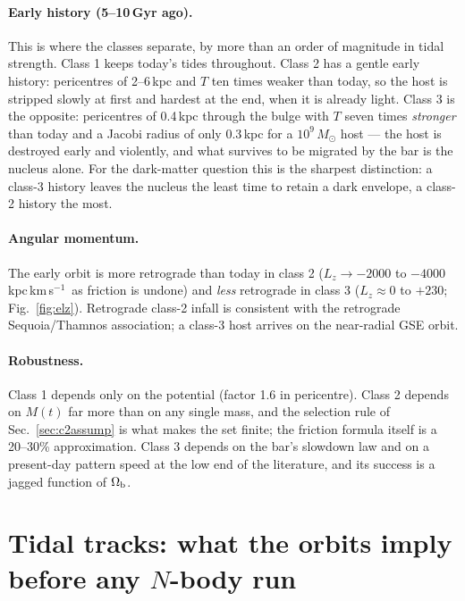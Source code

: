 \documentclass[11pt,a4paper]{article}
\newcommand{\kms}{km\,s$^{-1}$}
\newcommand{\Msun}{M_\odot}
\newcommand{\Lz}{L_z}
\newcommand{\Ob}{\Omega_{\rm b}}
\begin{document}
\paragraph{Early history (5--10\,Gyr ago).} This is where the classes separate, by more than an
order of magnitude in tidal strength. Class 1 keeps today's tides throughout. Class 2 has a
gentle early history: pericentres of 2--6\,kpc and $T$ ten times weaker than today, so the host
is stripped slowly at first and hardest at the end, when it is already light. Class 3 is the
opposite: pericentres of 0.4\,kpc through the bulge with $T$ seven times \emph{stronger} than
today and a Jacobi radius of only 0.3\,kpc for a $10^9\,\Msun$ host --- the host is destroyed
early and violently, and what survives to be migrated by the bar is the nucleus alone. For
the dark-matter question this is the sharpest distinction: a class-3 history leaves the
nucleus the least time to retain a dark envelope, a class-2 history the most.

\paragraph{Angular momentum.} The early orbit is more retrograde than today in class 2
($\Lz\to-2000$ to $-4000$\,kpc\,\kms\ as friction is undone) and \emph{less} retrograde in
class 3 ($\Lz\approx0$ to $+230$; Fig.~\ref{fig:elz}). Retrograde class-2 infall is consistent
with the retrograde Sequoia/Thamnos association; a class-3 host arrives on the near-radial GSE
orbit.

\paragraph{Robustness.} Class 1 depends only on the potential (factor 1.6 in pericentre).
Class 2 depends on $M(t)$ far more than on any single mass, and the selection rule of
Sec.~\ref{sec:c2assump} is what makes the set finite; the friction formula itself is a
20--30\% approximation. Class 3 depends on the bar's slowdown law and on a present-day pattern
speed at the low end of the literature, and its success is a jagged function of $\Ob$.


\section{Tidal tracks: what the orbits imply before any $N$-body run}
\label{sec:tracks}
\end{document}
